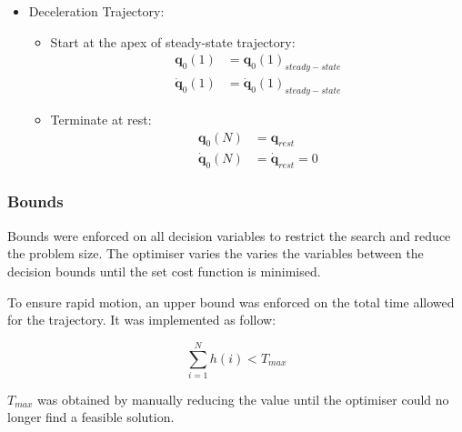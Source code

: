 \begin{itemize}
            \item Deceleration Trajectory:
            \begin{itemize}
                \item Start at the apex of steady-state trajectory:
                \begin{equation}
                    \begin{split}
                        \bm{q}_0(1) &= \bm{q}_0(1)_{steady-state} \\
                        \dot{\bm{q}}_0(1) &= \dot{\bm{q}}_0(1)_{steady-state}                     
                    \end{split}
                \end{equation}
                \item Terminate at rest:
                \begin{equation} \label{eq:terminal_decel}
                    \begin{split}
                        \bm{q}_0(N) &= \bm{q}_{rest} \\
                        \dot{\bm{q}}_0(N) &= \dot{\bm{q}}_{rest} = 0
                    \end{split}
                \end{equation}            
            \end{itemize}
        \end{itemize}
        
        \subsubsection{Bounds}
        Bounds were enforced on all decision variables to restrict the search and reduce the problem size. The optimiser varies the varies the variables between the decision bounds until the set cost function is minimised.
        
        To ensure rapid motion, an upper bound was enforced on the total time allowed for the trajectory. It was implemented as follow:
        
        \begin{equation}
            \sum^N_{i=1}h(i) < T_{max}
        \end{equation}
    
        $T_{max}$ was obtained by manually reducing the value until the optimiser could no longer find a feasible solution.
        

